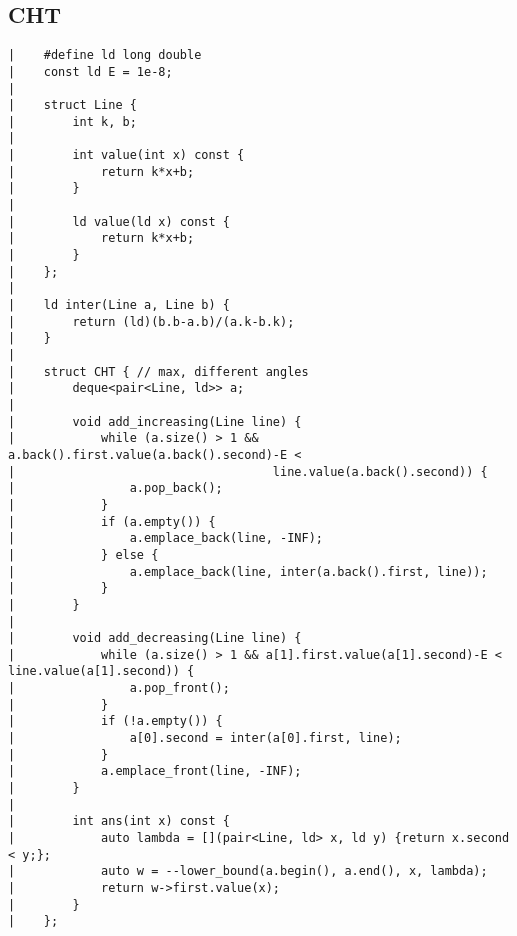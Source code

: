 \documentclass[a4paper, 10pt]{article}
\begin{document}
\begin{center}
\section*{CHT}
\begin{verbatim}
|    #define ld long double
|    const ld E = 1e-8;
|    
|    struct Line {
|        int k, b;
|    
|        int value(int x) const {
|            return k*x+b;
|        }
|    
|        ld value(ld x) const {
|            return k*x+b;
|        }
|    };
|    
|    ld inter(Line a, Line b) {
|        return (ld)(b.b-a.b)/(a.k-b.k);
|    }
|    
|    struct CHT { // max, different angles
|        deque<pair<Line, ld>> a;
|    
|        void add_increasing(Line line) {
|            while (a.size() > 1 && a.back().first.value(a.back().second)-E <
|                                    line.value(a.back().second)) {
|                a.pop_back();
|            }
|            if (a.empty()) {
|                a.emplace_back(line, -INF);
|            } else {
|                a.emplace_back(line, inter(a.back().first, line));
|            }
|        }
|    
|        void add_decreasing(Line line) {
|            while (a.size() > 1 && a[1].first.value(a[1].second)-E < line.value(a[1].second)) {
|                a.pop_front();
|            }
|            if (!a.empty()) {
|                a[0].second = inter(a[0].first, line);
|            }
|            a.emplace_front(line, -INF);
|        }
|    
|        int ans(int x) const {
|            auto lambda = [](pair<Line, ld> x, ld y) {return x.second < y;};
|            auto w = --lower_bound(a.begin(), a.end(), x, lambda);
|            return w->first.value(x);
|        }
|    };
\end{verbatim}


\end{center}
\end{document}
